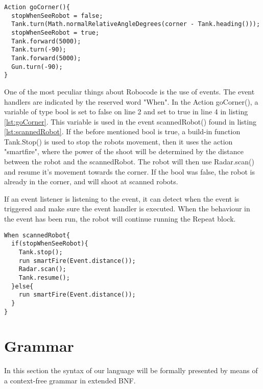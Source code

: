 \begin{lstlisting}[caption={Code listing of the Action goCorner()}, xleftmargin=.2\textwidth, label={lst:goCorner}]
Action goCorner(){
  stopWhenSeeRobot = false;  
  Tank.turn(Math.normalRelativeAngleDegrees(corner - Tank.heading()));      
  stopWhenSeeRobot = true;
  Tank.forward(5000);
  Tank.turn(-90);
  Tank.forward(5000);
  Gun.turn(-90);
}
\end{lstlisting}

One of the most peculiar things about Robocode is the use of events. The event handlers are indicated by the reserved word "When". 
In the Action goCorner(), a variable of type bool is set to false on line 2 and set to true in line 4 in listing \ref{lst:goCorner}. This variable is used in the event scannedRobot() found in listing \ref{lst:scannedRobot}. If the before mentioned bool is true, a build-in function Tank.Stop() is used to stop the robots movement, then it uses the action "smartfire", where the power of the shoot will be determined by the distance between the robot and the scannedRobot. The robot will then use Radar.scan() and resume it's movement towards the corner. If the bool was false, the robot is already in the corner, and will shoot at scanned robots.

If an event listener is listening to the event, it can detect when the event is triggered and make sure the event handler is executed. When the behaviour in the event has been run, the robot will continue running the Repeat block.  


\begin{lstlisting}[caption={Code listing of the event scannedRobot()} label=corners3, xleftmargin=.2\textwidth, label={lst:scannedRobot}]
When scannedRobot{
  if(stopWhenSeeRobot){
    Tank.stop();                                     
    run smartFire(Event.distance());
    Radar.scan();                                     
    Tank.resume();                                   
  }else{
    run smartFire(Event.distance());
  }
}
\end{lstlisting}



\section{Grammar}
\label{sec:Grammar}
In this section the syntax of our language will be formally presented by means of a context-free grammar in extended BNF.

